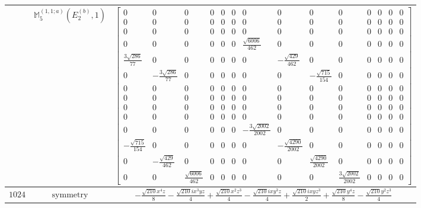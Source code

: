 \documentclass[fleqn,8pt,landscape]{jsarticle}
\begin{document}
\begin{longtable}{ccc}
$  $ & $ \mathbb{M}_{5}^{(1,1;a)}(E_{2}^{(b)},1) $ & $ \begin{bmatrix} 0 & 0 & 0 & 0 & 0 & 0 & 0 & 0 & 0 & 0 & 0 & 0 & 0 & 0 \\ 0 & 0 & 0 & 0 & 0 & 0 & 0 & 0 & 0 & 0 & 0 & 0 & 0 & 0 \\ 0 & 0 & 0 & 0 & 0 & 0 & 0 & 0 & 0 & 0 & 0 & 0 & 0 & 0 \\ 0 & 0 & 0 & 0 & 0 & 0 & \frac{\sqrt{6006}}{462} & 0 & 0 & 0 & 0 & 0 & 0 & 0 \\ \frac{3 \sqrt{286}}{77} & 0 & 0 & 0 & 0 & 0 & 0 & - \frac{\sqrt{429}}{462} & 0 & 0 & 0 & 0 & 0 & 0 \\ 0 & - \frac{3 \sqrt{286}}{77} & 0 & 0 & 0 & 0 & 0 & 0 & - \frac{\sqrt{715}}{154} & 0 & 0 & 0 & 0 & 0 \\ 0 & 0 & 0 & 0 & 0 & 0 & 0 & 0 & 0 & 0 & 0 & 0 & 0 & 0 \\ 0 & 0 & 0 & 0 & 0 & 0 & 0 & 0 & 0 & 0 & 0 & 0 & 0 & 0 \\ 0 & 0 & 0 & 0 & 0 & 0 & 0 & 0 & 0 & 0 & 0 & 0 & 0 & 0 \\ 0 & 0 & 0 & 0 & 0 & 0 & 0 & 0 & 0 & 0 & 0 & 0 & 0 & 0 \\ 0 & 0 & 0 & 0 & 0 & 0 & - \frac{3 \sqrt{2002}}{2002} & 0 & 0 & 0 & 0 & 0 & 0 & 0 \\ - \frac{\sqrt{715}}{154} & 0 & 0 & 0 & 0 & 0 & 0 & - \frac{\sqrt{4290}}{2002} & 0 & 0 & 0 & 0 & 0 & 0 \\ 0 & - \frac{\sqrt{429}}{462} & 0 & 0 & 0 & 0 & 0 & 0 & \frac{\sqrt{4290}}{2002} & 0 & 0 & 0 & 0 & 0 \\ 0 & 0 & \frac{\sqrt{6006}}{462} & 0 & 0 & 0 & 0 & 0 & 0 & \frac{3 \sqrt{2002}}{2002} & 0 & 0 & 0 & 0 \end{bmatrix} $ \\ \hline
$ 1024 $ & $ \text{symmetry} $ & $ - \frac{\sqrt{210} x^{4} z}{8} - \frac{\sqrt{210} i x^{3} y z}{4} + \frac{\sqrt{210} x^{2} z^{3}}{4} - \frac{\sqrt{210} i x y^{3} z}{4} + \frac{\sqrt{210} i x y z^{3}}{2} + \frac{\sqrt{210} y^{4} z}{8} - \frac{\sqrt{210} y^{2} z^{3}}{4} $ \\

\end{longtable}
\end{document}
